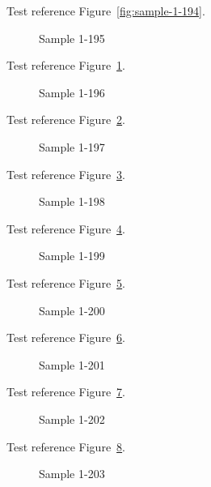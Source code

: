 Test reference Figure~\ref{fig:sample-1-194}.

\begin{figure}[tbhp]
\caption{Sample 1-195}
\label{fig:sample-1-195}
\end{figure}

Test reference Figure~\ref{fig:sample-1-195}.

\begin{figure}[tbhp]
\caption{Sample 1-196}
\label{fig:sample-1-196}
\end{figure}

Test reference Figure~\ref{fig:sample-1-196}.

\begin{figure}[tbhp]
\caption{Sample 1-197}
\label{fig:sample-1-197}
\end{figure}

Test reference Figure~\ref{fig:sample-1-197}.

\begin{figure}[tbhp]
\caption{Sample 1-198}
\label{fig:sample-1-198}
\end{figure}

Test reference Figure~\ref{fig:sample-1-198}.

\begin{figure}[tbhp]
\caption{Sample 1-199}
\label{fig:sample-1-199}
\end{figure}

Test reference Figure~\ref{fig:sample-1-199}.

\begin{figure}[tbhp]
\caption{Sample 1-200}
\label{fig:sample-1-200}
\end{figure}

Test reference Figure~\ref{fig:sample-1-200}.

\begin{figure}[tbhp]
\caption{Sample 1-201}
\label{fig:sample-1-201}
\end{figure}

Test reference Figure~\ref{fig:sample-1-201}.

\begin{figure}[tbhp]
\caption{Sample 1-202}
\label{fig:sample-1-202}
\end{figure}

Test reference Figure~\ref{fig:sample-1-202}.

\begin{figure}[tbhp]
\caption{Sample 1-203}
\label{fig:sample-1-203}
\end{figure}

